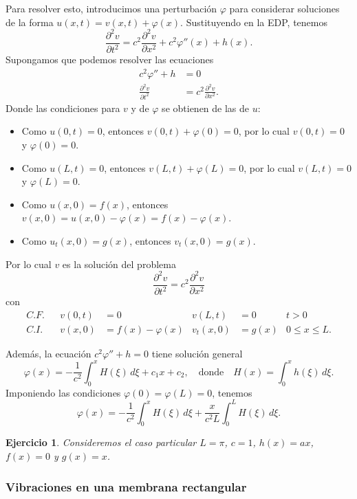 \documentclass[11pt,letterpaper]{report}
\newtheorem{exe}[defn]{Ejercicio}
\newcommand\<{\langle}
\renewcommand\>{\rangle}
\renewcommand\phi\varphi
\begin{document}
Para resolver esto, introducimos una perturbación $\phi$ para
considerar soluciones de la forma $u(x,t)=v(x,t)+\phi(x)$.
Sustituyendo en la EDP, tenemos
\[
  \frac{\partial ^2v}{\partial t^2}
  = c^2 \frac{\partial ^2v}{\partial x^2} + c^2\phi''(x)+ h(x)
.\]
Supongamos que podemos resolver las ecuaciones
\begin{align*}
  c^2\phi''+h &= 0 \\
  \frac{\partial ^2v}{\partial t^2}
  &= c^2 \frac{\partial ^2v}{\partial x^2}.
\end{align*}
Donde las condiciones para $v$ y de $\phi$ se obtienen de las de $u$:
\begin{itemize}
  \item Como $u(0,t) = 0$, entonces $v(0,t)+\phi(0)=0$, por lo cual
    $v(0,t)=0$ y $\phi(0)=0$.
  \item Como $u(L,t)=0$, entonces $v(L,t)+\phi(L)=0$, por lo cual
    $v(L,t)=0$ y $\phi(L)=0$.
  \item Como $u(x,0)=f(x)$, entonces
    $v(x,0)=u(x,0)-\phi(x)=f(x)-\phi(x)$.
  \item Como $u_t(x,0)=g(x)$, entonces $v_t(x,0)=g(x)$.
\end{itemize}
Por lo cual $v$ es la solución del problema
\[
  \frac{\partial ^2v}{\partial t^2}
  = c^2 \frac{\partial ^2v}{\partial x^2}
\]
con
\begin{align*}
  C.F.&& v(0,t)&=0 & v(L,t)&=0 & t>0 \\
  C.I.&& v(x,0)&=f(x)-\phi(x) & v_t(x,0)&=g(x) & 0\leq x\leq L.
\end{align*}

Además, la ecuación $c^2\phi''+h=0$ tiene solución general
\[
  \phi(x) = -\frac{1}{c^2}\int_{0}^{x}H(\xi)\,d\xi+c_1x+c_2,
  \quad \text{donde} \quad H(x) = \int_{0}^{x}h(\xi)\,d\xi
.\]
Imponiendo las condiciones $\phi(0)=\phi(L)=0$, tenemos
\[
  \phi(x)=-\frac{1}{c^{2}}\int_{0}^{x}H(\xi)\,d\xi
  + \frac{x}{c^2L}\int_{0}^{L}H(\xi)\,d\xi
.\]

\begin{exe}
  Consideremos el caso particular $L=\pi$, $c=1$, $h(x)=ax$, $f(x)=0$
  y $g(x)=x$.
\end{exe}

\subsubsection{Vibraciones en una membrana rectangular}


\end{document}

